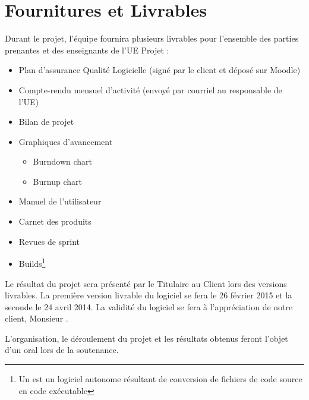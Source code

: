 \chapter{Fournitures et Livrables}
Durant le projet, l’équipe fournira plusieurs livrables pour l’ensemble des parties prenantes et des enseignants de l’UE Projet :

\begin{itemize}
	\item Plan d'assurance Qualité Logicielle (signé par le client et déposé sur Moodle)
	\item Compte-rendu mensuel d'activité (envoyé par courriel au responsable de l'UE)
	\item Bilan de projet
	\item Graphiques d’avancement
	\begin{itemize}
		\item Burndown chart
		\item Burnup chart
	\end{itemize}
	\item Manuel de l’utilisateur
	\item Carnet des produits 
	\item Revues de sprint
	\item Builds\footnote{Un  est un  logiciel autonome résultant de conversion de fichiers de code source en code exécutable}
\end{itemize}

Le résultat du projet sera présenté par le Titulaire au Client lors des versions livrables. La première version livrable du logiciel se fera le 26 février 2015 et la seconde le 24 avril 2014. La validité du logiciel se fera à l'appréciation de notre client, Monsieur .

L'organisation, le déroulement du projet et les résultats obtenus feront l'objet d'un oral lors de la soutenance. 
